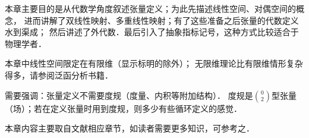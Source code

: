 本章主要目的是从代数学角度叙述张量定义；为此先描述线性空间、对偶空间的概念，
进而讲解了双线性映射、多重线性映射；有了这些准备之后张量的代数定义水到渠成；
然后讲述了外代数．最后引入了抽象指标记号，这种方式比较适合于物理学者．

本章中线性空间限定在有限维（显示标明的除外）；
无限维理论比有限维情形复杂得多，请参阅泛函分析书籍．

需要强调：张量定义不需要度规（度量、内积等附加结构）．
度规是$\binom{0}{2}$型张量（场）；若在定义张量时用到度规，则多少有些循环定义的感觉．

本章内容主要取自文献\parencite{qiuws-2019-v2}相应章节，如读者需要更多知识，可参考之．

\printbibliography[heading=subbibliography,title=第\ref{chmla}章参考文献]
\endinput


